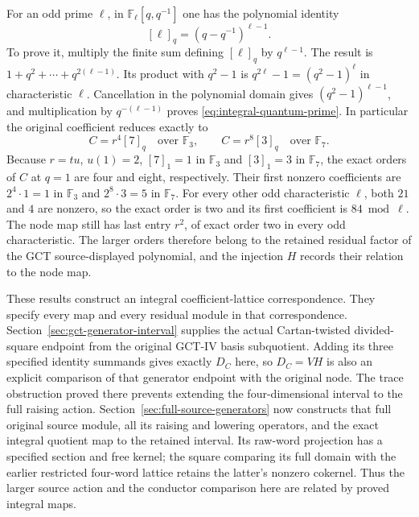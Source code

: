 For an odd prime $\ell$, in $\mathbb F_\ell[q,q^{-1}]$ one has the polynomial
identity
\begin{equation}\label{eq:integral-quantum-prime}
 [\ell]_q=(q-q^{-1})^{\ell-1}.
\end{equation}
To prove it, multiply the finite sum defining $[\ell]_q$ by $q^{\ell-1}$.
The result is $1+q^2+\cdots+q^{2(\ell-1)}$.
Its product with $q^2-1$ is $q^{2\ell}-1=(q^2-1)^\ell$ in
characteristic $\ell$. Cancellation in the polynomial domain gives
$(q^2-1)^{\ell-1}$, and multiplication by $q^{-(\ell-1)}$ proves
\eqref{eq:integral-quantum-prime}. In particular the original coefficient
reduces exactly to
\[
 C=r^4[7]_q\quad\text{over }\mathbb F_3,\qquad
 C=r^8[3]_q\quad\text{over }\mathbb F_7.
\]
Because $r=tu$, $u(1)=2$, $[7]_1=1$ in $\mathbb F_3$ and $[3]_1=3$ in
$\mathbb F_7$, the exact orders of $C$ at $q=1$ are four and eight,
respectively. Their first nonzero coefficients are
$2^4\cdot1=1$ in $\mathbb F_3$ and $2^8\cdot3=5$ in $\mathbb F_7$.
For every other odd characteristic $\ell$, both $21$ and $4$ are
nonzero, so the exact order is two and its first coefficient is
$84\bmod\ell$. The node map still has last entry $r^2$, of exact
order two in every odd characteristic. The larger orders therefore
belong to the retained residual factor of the GCT source-displayed polynomial,
and the injection $H$ records their relation to the node map.

These results construct an integral coefficient-lattice correspondence.
They specify every map and every residual module in that correspondence.
Section~\ref{sec:gct-generator-interval} supplies the actual Cartan-twisted
divided-square endpoint from the original GCT-IV basis subquotient.
Adding its three specified identity summands gives exactly $D_C$ here,
so $D_C=VH$ is also an explicit comparison of that generator endpoint
with the original node. The trace obstruction proved there prevents
extending the four-dimensional interval to the full raising action.
Section~\ref{sec:full-source-generators} now constructs that full original
source module, all its raising and lowering operators, and the exact
integral quotient map to the retained interval. Its raw-word projection
has a specified section and free kernel; the square comparing its full
domain with the earlier restricted four-word lattice retains the latter's
nonzero cokernel. Thus the larger source action and the conductor
comparison here are related by proved integral maps.

